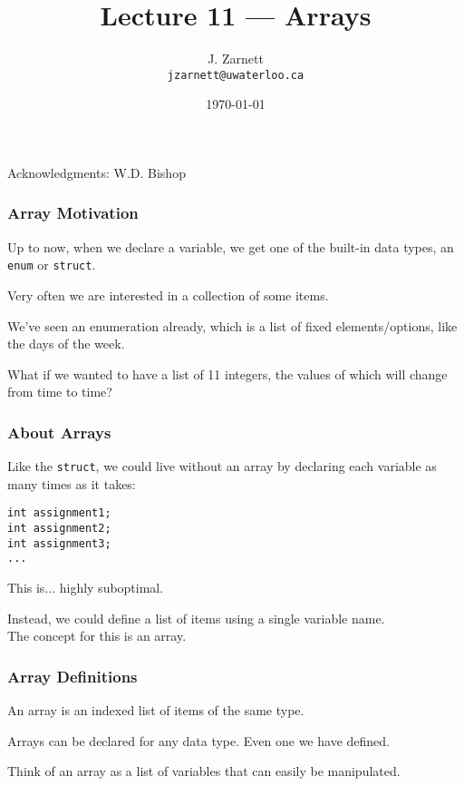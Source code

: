 

\title{Lecture 11 --- Arrays }

\author{J. Zarnett\\
\texttt{jzarnett@uwaterloo.ca}}
\date{\today}



\begin{frame}
  \titlepage
  
  \begin{center}
  \small{Acknowledgments: W.D. Bishop}
  \end{center}
 \end{frame}
 
\begin{frame}
\frametitle{Array Motivation}
Up to now, when we declare a variable, we get one of the built-in data types, an \texttt{enum} or \texttt{struct}.

Very often we are interested in a collection of some items.

We've seen an enumeration already, which is a list of fixed elements/options, like the days of the week.

What if we wanted to have a list of 11 integers, the values of which will change from time to time?

\end{frame}

\begin{frame}[fragile]
\frametitle{About Arrays}
Like the \texttt{struct}, we could live without an array by declaring each variable as many times as it takes:

\begin{verbatim}
int assignment1;
int assignment2;
int assignment3;
...
\end{verbatim}

This is... highly suboptimal. 

Instead, we could define a list of items using a single variable name.\\
\quad The concept for this is an \alert{array}.

\end{frame}



\begin{frame}
\frametitle{Array Definitions}

An array is an indexed list of items of the same type.

Arrays can be declared for any data type. Even one we have defined.

Think of an array as a list of variables that can easily be manipulated.

\end{frame}

